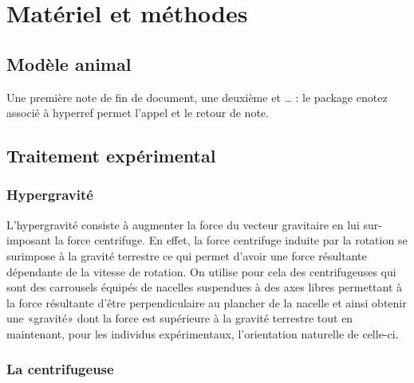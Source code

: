 \chaptertoc{}

\section{Matériel et méthodes}

	\subsection{Modèle animal}

	\lipsum[1]

	Une première note de fin de document, une deuxième et \ldots {}      : le package enotez associé à hyperref permet l'appel et le retour de note.

	\subsection{Traitement expérimental}

		\subsubsection{Hypergravité}
			\label{hypergravite} %

			L'hypergravité consiste à augmenter la force du vecteur gravitaire en lui sur-imposant la force centrifuge. En effet, la force centrifuge induite par la rotation se surimpose à la gravité terrestre ce qui permet d'avoir une force résultante dépendante de la vitesse de rotation. On utilise pour cela des centrifugeuses qui sont des carrousels équipés de nacelles suspendues à des axes libres permettant à la force résultante d'être perpendiculaire au plancher de la nacelle et ainsi obtenir une «gravité» dont la force est supérieure à la gravité terrestre tout en maintenant, pour les individus expérimentaux, l'orientation \og naturelle \fg de celle-ci.
		
		\subsubsection{La centrifugeuse}

